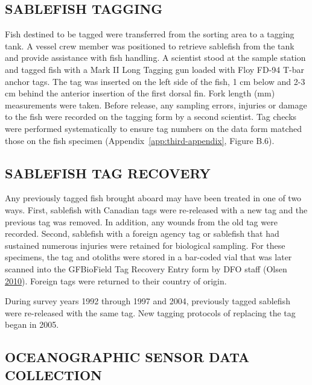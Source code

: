 \documentclass[12pt]{article}\usepackage[]{graphicx}\usepackage[]{color}
\begin{document}
\hypertarget{sablefish-tagging}{%
\subsection{SABLEFISH TAGGING}\label{sablefish-tagging}}

Fish destined to be tagged were transferred from the sorting area to a tagging tank. A vessel crew member was positioned to retrieve sablefish from the tank and provide assistance with fish handling. A scientist stood at the sample station and tagged fish with a Mark II Long Tagging gun loaded with Floy FD-94 T-bar anchor tags. The tag was inserted on the left side of the fish, 1 cm below and 2-3 cm behind the anterior insertion of the first dorsal fin. Fork length (mm) measurements were taken. Before release, any sampling errors, injuries or damage to the fish were recorded on the tagging form by a second scientist. Tag checks were performed systematically to ensure tag numbers on the data form matched those on the fish specimen (Appendix~\ref{app:third-appendix}, Figure B.6).

\hypertarget{sablefish-tag-recovery}{%
\subsection{SABLEFISH TAG RECOVERY}\label{sablefish-tag-recovery}}

Any previously tagged fish brought aboard may have been treated in one of two ways. First, sablefish with Canadian tags were re-released with a new tag and the previous tag was removed. In addition, any wounds from the old tag were recorded. Second, sablefish with a foreign agency tag or sablefish that had sustained numerous injuries were retained for biological sampling. For these specimens, the tag and otoliths were stored in a bar-coded vial that was later scanned into the GFBioField Tag Recovery Entry form by DFO staff (Olsen \protect\hyperlink{ref-Olsen2010}{2010}). Foreign tags were returned to their country of origin.

During survey years 1992 through 1997 and 2004, previously tagged sablefish were re-released with the same tag. New tagging protocols of replacing the tag began in 2005.

\hypertarget{oceanographic-sensor-data-collection}{%
\subsection{OCEANOGRAPHIC SENSOR DATA COLLECTION}\label{oceanographic-sensor-data-collection}}
\end{document}
